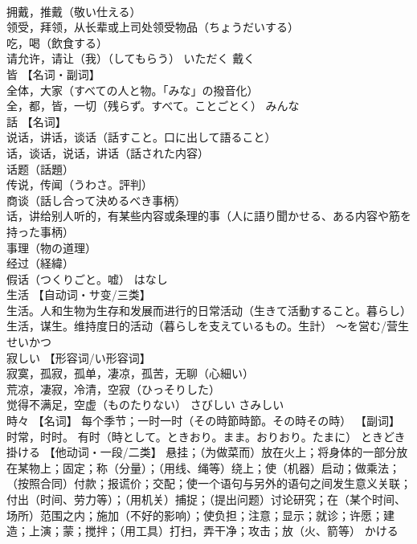 \documentclass[8pt]{extreport}
\begin{document}
\begin{CJK}{UTF8}{min}
\\	拥戴，推戴（敬い仕える） 
\\	领受，拜领，从长辈或上司处领受物品（ちょうだいする） 
\\	吃，喝（飲食する） 
\\	请允许，请让（我）（してもらう）	いただく	戴く
\\	皆	【名词・副词】 
\\	全体，大家（すべての人と物。「みな」の撥音化） 
\\	全，都，皆，一切（残らず。すべて。ことごとく）	みんな	
\\	話	【名词】 
\\	说话，讲话，谈话（話すこと。口に出して語ること） 
\\	话，谈话，说话，讲话（話された内容） 
\\	话题（話題） 
\\	传说，传闻（うわさ。評判） 
\\	商谈（話し合って決めるべき事柄） 
\\	话，讲给别人听的，有某些内容或条理的事（人に語り聞かせる、ある内容や筋を持った事柄） 
\\	事理（物の道理） 
\\	经过（経緯） 
\\	假话（つくりごと。嘘）	はなし	
\\	生活	【自动词・サ变/三类】 
\\	生活。人和生物为生存和发展而进行的日常活动（生きて活動すること。暮らし） 
\\	生活，谋生。维持度日的活动（暮らしを支えているもの。生計） 〜を営む/营生	せいかつ	
\\	寂しい	【形容词/い形容词】 
\\	寂寞，孤寂，孤单，凄凉，孤苦，无聊（心細い） 
\\	荒凉，凄寂，冷清，空寂（ひっそりした） 
\\	觉得不满足，空虚（ものたりない）	さびしい さみしい	
\\	時々	【名词】 每个季节；一时一时（その時節時節。その時その時） 【副词】 时常，时时。 有时（時として。ときおり。まま。おりおり。たまに）	ときどき	
\\	掛ける	【他动词・一段/二类】 悬挂；（为做菜而）放在火上；将身体的一部分放在某物上；固定；称（分量）；（用线、绳等）绕上；使（机器）启动；做乘法；（按照合同）付款；报谎价；交配；使一个语句与另外的语句之间发生意义关联；付出（时间、劳力等）；（用机关）捕捉；（提出问题）讨论研究；在（某个时间、场所）范围之内；施加（不好的影响）；使负担；注意；显示；就诊；许愿；建造；上演；蒙；搅拌；（用工具）打扫，弄干净；攻击；放（火、箭等）	かける	

\end{CJK}
\end{document}
